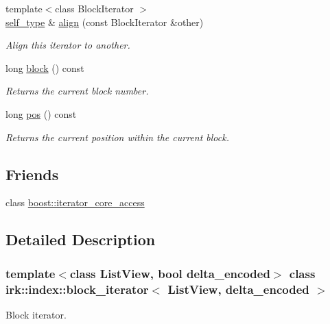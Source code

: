 \begin{DoxyCompactItemize}
\item 
{\footnotesize template$<$class Block\+Iterator $>$ }\\\mbox{\hyperlink{classirk_1_1index_1_1block__iterator_a338ee8fee726492e9f8bbad4b4d75766}{self\+\_\+type}} \& \mbox{\hyperlink{classirk_1_1index_1_1block__iterator_a901a557c429c737587e30b123bfc1641}{align}} (const Block\+Iterator \&other)
\begin{DoxyCompactList}\small\item\em Align this iterator to another. \end{DoxyCompactList}\item 
long \mbox{\hyperlink{classirk_1_1index_1_1block__iterator_ae172ebede460597574078b85ae820a4c}{block}} () const
\begin{DoxyCompactList}\small\item\em Returns the current block number. \end{DoxyCompactList}\item 
long \mbox{\hyperlink{classirk_1_1index_1_1block__iterator_a36dd1b7e5b2b3d3b8865030c239d4ac9}{pos}} () const
\begin{DoxyCompactList}\small\item\em Returns the current position within the current block. \end{DoxyCompactList}\end{DoxyCompactItemize}
\subsection*{Friends}
\begin{DoxyCompactItemize}
\item 
class \mbox{\hyperlink{classirk_1_1index_1_1block__iterator_ac09f73e325921cc50ebcd96bed0f8096}{boost\+::iterator\+\_\+core\+\_\+access}}
\end{DoxyCompactItemize}


\subsection{Detailed Description}
\subsubsection*{template$<$class List\+View, bool delta\+\_\+encoded$>$\newline
class irk\+::index\+::block\+\_\+iterator$<$ List\+View, delta\+\_\+encoded $>$}

Block iterator. 


